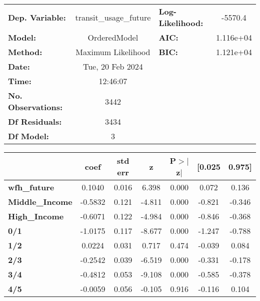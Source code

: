 \documentclass{report}
\begin{document}
\begin{center}
\begin{tabular}{lclc}
\toprule
\textbf{Dep. Variable:}    & transit\_usage\_future & \textbf{  Log-Likelihood:    } &   -5570.4   \\
\textbf{Model:}            &      OrderedModel      & \textbf{  AIC:               } & 1.116e+04   \\
\textbf{Method:}           &   Maximum Likelihood   & \textbf{  BIC:               } & 1.121e+04   \\
\textbf{Date:}             &    Tue, 20 Feb 2024    & \textbf{                     } &             \\
\textbf{Time:}             &        12:46:07        & \textbf{                     } &             \\
\textbf{No. Observations:} &           3442         & \textbf{                     } &             \\
\textbf{Df Residuals:}     &           3434         & \textbf{                     } &             \\
\textbf{Df Model:}         &              3         & \textbf{                     } &             \\
\bottomrule
\end{tabular}
\begin{tabular}{lcccccc}
                        & \textbf{coef} & \textbf{std err} & \textbf{z} & \textbf{P$> |$z$|$} & \textbf{[0.025} & \textbf{0.975]}  \\
\midrule
\textbf{wfh\_future}    &       0.1040  &        0.016     &     6.398  &         0.000        &        0.072    &        0.136     \\
\textbf{Middle\_Income} &      -0.5832  &        0.121     &    -4.811  &         0.000        &       -0.821    &       -0.346     \\
\textbf{High\_Income}   &      -0.6071  &        0.122     &    -4.984  &         0.000        &       -0.846    &       -0.368     \\
\textbf{0/1}            &      -1.0175  &        0.117     &    -8.677  &         0.000        &       -1.247    &       -0.788     \\
\textbf{1/2}            &       0.0224  &        0.031     &     0.717  &         0.474        &       -0.039    &        0.084     \\
\textbf{2/3}            &      -0.2542  &        0.039     &    -6.519  &         0.000        &       -0.331    &       -0.178     \\
\textbf{3/4}            &      -0.4812  &        0.053     &    -9.108  &         0.000        &       -0.585    &       -0.378     \\
\textbf{4/5}            &      -0.0059  &        0.056     &    -0.105  &         0.916        &       -0.116    &        0.104     \\
\bottomrule
\end{tabular}
\end{center}
\end{document}
